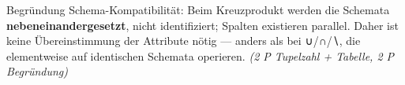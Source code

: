 \documentclass[11pt, a4paper]{article}
\begin{document}
Begründung Schema-Kompatibilität: Beim Kreuzprodukt werden die Schemata \textbf{nebeneinandergesetzt}, nicht identifiziert; Spalten existieren parallel. Daher ist keine Übereinstimmung der Attribute nötig — anders als bei ∪/∩/∖, die elementweise auf identischen Schemata operieren. \textit{(2 P Tupelzahl + Tabelle, 2 P Begründung)}





\end{document}
